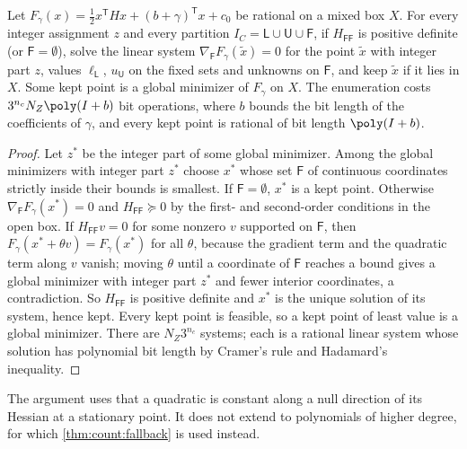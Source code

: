 \begin{lemma}\label{lem:sp:faces}
Let $F_\gamma(x)=\frac12x^{\mathsf T}Hx+(b+\gamma)^{\mathsf T}x+c_0$ be
rational on a mixed box $X$. For every integer assignment $z$ and every
partition $I_C=\mathsf L\cup\mathsf U\cup\mathsf F$, if
$H_{\mathsf F\mathsf F}$ is positive definite (or $\mathsf F=\emptyset$),
solve the linear system $\nabla_{\mathsf F}F_\gamma(\tilde x)=0$ for the point
$\tilde x$ with integer part $z$, values $\ell_{\mathsf L}$, $u_{\mathsf U}$
on the fixed sets and unknowns on $\mathsf F$, and keep $\tilde x$ if it lies
in $X$. Some kept point is a global minimizer of $F_\gamma$ on $X$. The
enumeration costs $3^{n_c}N_Z\poly(I+b)$ bit operations, where $b$ bounds the
bit length of the coefficients of $\gamma$, and every kept point is rational
of bit length $\poly(I+b)$.
\end{lemma}

\begin{proof}
Let $z^*$ be the integer part of some global minimizer. Among the global
minimizers with integer part $z^*$ choose $x^*$ whose set $\mathsf F$ of
continuous coordinates strictly inside their bounds is smallest. If
$\mathsf F=\emptyset$, $x^*$ is a kept point. Otherwise
$\nabla_{\mathsf F}F_\gamma(x^*)=0$ and $H_{\mathsf F\mathsf F}\succeq0$ by the
first- and second-order conditions in the open box. If
$H_{\mathsf F\mathsf F}v=0$ for some nonzero $v$ supported on $\mathsf F$,
then $F_\gamma(x^*+\theta v)=F_\gamma(x^*)$ for all $\theta$, because the
gradient term and the quadratic term along $v$ vanish; moving $\theta$ until
a coordinate of $\mathsf F$ reaches a bound gives a global minimizer with
integer part $z^*$ and fewer interior coordinates, a contradiction. So
$H_{\mathsf F\mathsf F}$ is positive definite and $x^*$ is the unique
solution of its system, hence kept. Every kept point is feasible, so a kept
point of least value is a global minimizer. There are $N_Z3^{n_c}$ systems;
each is a rational linear system whose solution has polynomial bit length
by Cramer's rule and Hadamard's inequality.
\end{proof}

The argument uses that a quadratic is constant along a null direction of
its Hessian at a stationary point. It does not extend to polynomials of
higher degree, for which \cref{thm:count:fallback} is used instead.

